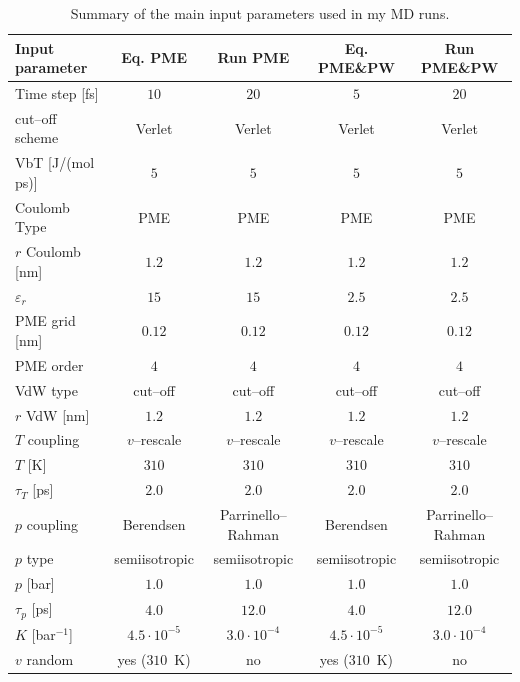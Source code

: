 \begin{table}[h!t]
	\centering\footnotesize
	\begin{tabular}{lcccc}
		\toprule
		Input parameter & Eq. \acs{PME} & Run \acs{PME} & Eq. \acs{PME}\&\acs{PW} & Run \acs{PME}\&\acs{PW} \\ \toprule
		Time step [fs]		& $10$ & $20$ & $5$ & $20$ \\ \midrule
		cut--off scheme		& Verlet & Verlet & Verlet & Verlet \\ \midrule
		VbT [J/(mol ps)]	& $5$ & $5$ & $5$ & $5$ \\ \midrule
		Coulomb Type		& \acs{PME}	& \acs{PME}	& \acs{PME} & \acs{PME} \\ \midrule
		$r$ Coulomb	[nm]	& $1.2$ & $1.2$ & $1.2$ & $1.2$ \\ \midrule
		$\varepsilon_r$		& $15$ & $15$ & $2.5$ & $2.5$ \\ \midrule
		\acs{PME} grid [nm]	& $0.12$ & $0.12$ & $0.12$ & $0.12$ \\ \midrule
	    \acs{PME} order		& $4$ & $4$ & $4$ & $4$ \\ \midrule
		VdW type			& cut--off & cut--off & cut--off & cut--off \\ \midrule
		$r$ VdW [nm]		& $1.2$ & $1.2$ & $1.2$ & $1.2$ \\ \midrule
		$T$ coupling		& $v$--rescale & $v$--rescale & $v$--rescale & $v$--rescale \\ \midrule
		$T$ [K]				& $310$ & $310$ & $310$ & $310$  \\ \midrule
		$\tau_T$ [ps]		& $2.0$ & $2.0$ & $2.0$ & $2.0$ \\ \midrule
		$p$ coupling		& Berendsen & Parrinello--Rahman & Berendsen & Parrinello--Rahman \\ \midrule
		$p$ type			& semiisotropic & semiisotropic & semiisotropic & semiisotropic \\ \midrule
		$p$ [bar]			& $1.0$ & $1.0$ & $1.0$ & $1.0$ \\ \midrule
		$\tau_p$ [ps]		& $4.0$ & $12.0$ & $4.0$ & $12.0$ \\ \midrule
		$K$ [bar$^{-1}$]	& $4.5\cdot 10^{-5}$ & $3.0\cdot 10^{-4}$ & $4.5\cdot 10^{-5}$ & $3.0\cdot 10^{-4}$ \\ \midrule
		$v$ random			& yes ($310$~K) & no & yes ($310$~K) & no \\ \bottomrule 
	\end{tabular}
	\caption{Summary of the main input parameters used in my \acs{MD} runs.}
	\label{tab:inputParam}
\end{table}

